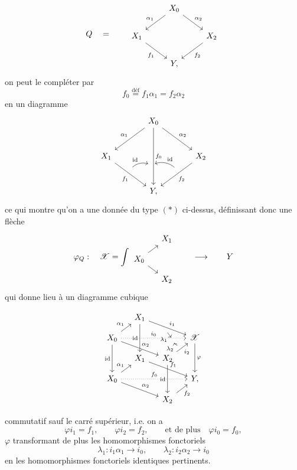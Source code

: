 \documentclass[11pt]{article}
\newcommand{\printedpage}[1]{\marginpar{\footnotesize p.~#1}}
\newcommand{\msp}[1]{\marginpar{\footnotesize [#1]}}
\newcommand{\sX}{\mathscr{X}}
\begin{document}
\printedpage{88}
\[
Q \quad = \qquad
\begin{tikzcd}
 & X_0 \arrow[dl, "\alpha_1"'] \arrow[dr, "\alpha_2"] & \\
X_1 \arrow[dr, "f_1"'] & & X_2 \arrow[dl, "f_2"] \\
 & Y, &
\end{tikzcd}
\]
on peut le compléter par
\[
f_0 \overset{\text{déf}}{=} f_1\alpha_1 = f_2\alpha_2
\]
en un diagramme
\[
\begin{tikzcd}[row sep=large, column sep=large]
 & X_0 \arrow[dl, "\alpha_1"'] \arrow[dr, "\alpha_2"] \arrow[dd, "f_0", ""'{name=F0, pos=0.65}] & \\
X_1 \arrow[dr, "f_1"', ""{name=F1, pos=0.4}] & & X_2 \arrow[dl, "f_2", ""'{name=F2, pos=0.4}] \\
 & Y, &
\arrow[from=F1, to=F0, bend left, "\mathrm{id}", shorten <=2pt, shorten >=2pt]
\arrow[from=F2, to=F0, bend right, "\mathrm{id}"', shorten <=2pt, shorten >=2pt]
\end{tikzcd}
\]
ce qui montre qu'on a une donnée du type $(*)$ ci-dessus, définissant donc une flèche
\[
\varphi_Q : \quad \sX = \int
\begin{tikzcd}[row sep=small, column sep=small]
 & X_1 \\
X_0 \arrow[ur] \arrow[dr] & \\
 & X_2
\end{tikzcd}
\qquad \longrightarrow \qquad Y
\]
qui donne lieu à un diagramme cubique

\msp{page 131}
\[
\begin{tikzcd}[row sep=small, column sep=small]
 & X_1 \arrow[dd, "\mathrm{id}"'] \arrow[rrd, "i_1", ""'{name=I1}] & & \\
X_0 \arrow[ru, "\alpha_1"] \arrow[rrr, dotted, "i_0", ""'{name=I0, pos=0.8}] \arrow[rrd, "\alpha_2"] \arrow[dd, "\mathrm{id}"'] & & & \sX \arrow[dd, "\varphi"] \\
 & X_1 \arrow[rrd, "f_1"] & X_2 \arrow[ru, "i_2"', ""{name=I2}] \arrow[dd, "\mathrm{id}"'] & \\
X_0 \arrow[ru, "\alpha_1"] \arrow[rrr, dotted, "f_0"] \arrow[rrd, "\alpha_2"] & & & Y, \\
 & & X_2 \arrow[ru, "f_2"'] &
\arrow[from=I1, to=I0, "\lambda_1"', shorten <=1pt, shorten >=1pt]
\arrow[from=I2, to=I0, bend left, "\lambda_2", shorten <=1pt, shorten >=1pt] %
\end{tikzcd}
\]

\printedpage{89}
commutatif sauf le carré supérieur, i.e. on a
\[
\varphi i_1 = f_1, \qquad \varphi i_2 = f_2, \qquad \text{et de plus} \quad \varphi i_0 = f_0,
\]
$\varphi$ transformant de plus les homomorphismes fonctoriels
\[
\lambda_1 : i_1\alpha_1 \longrightarrow i_0, \qquad \lambda_2 : i_2\alpha_2 \longrightarrow i_0
\]
en les homomorphismes fonctoriels identiques pertinents.
\end{document}
